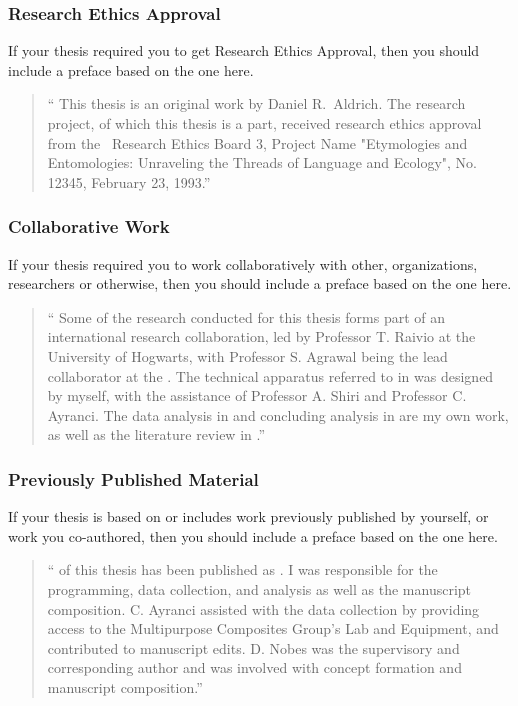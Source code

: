 			\subsubsection{Research Ethics Approval}\label{preface:REA}
				If your thesis required you to get Research Ethics Approval, then you should include a preface based on the one here.

				\begin{quote}
					\enquote{%
						This thesis is an original work by Daniel R.\ Aldrich. 
						The research project, of which this thesis is a part, received research ethics approval from the \UofA\ Research Ethics Board 3, Project Name "Etymologies and Entomologies: Unraveling the Threads of Language and Ecology", No. 12345, February 23, 1993.}%
				\end{quote}

			\subsubsection{Collaborative Work}\label{preface:CW}
				If your thesis required you to work collaboratively with other, organizations, researchers or otherwise, then you should include a preface based on the one here.

				\begin{quote}
					\enquote{%
						Some of the research conducted for this thesis forms part of an international research collaboration, led by Professor T. Raivio at the University of Hogwarts, with Professor S. Agrawal being the lead collaborator at the \UofA. 
						The technical apparatus referred to in  was designed by myself, with the assistance of Professor A. Shiri and Professor C. Ayranci. 
						The data analysis in  and concluding analysis in  are my own work, as well as the literature review in .}
				\end{quote}

			\subsubsection{Previously Published Material}\label{preface:PPW}
				If your thesis is based on or includes work previously published by yourself, or work you co-authored, then you should include a preface based on the one here.

				\begin{quote}
					\enquote{%
						 of this thesis has been published as . 
						I was responsible for the programming, data collection, and analysis as well as the manuscript composition. C. Ayranci assisted with the data collection by providing access to the Multipurpose Composites Group's Lab and Equipment, and contributed to manuscript edits. D. Nobes was the supervisory and corresponding author and was involved with concept formation and manuscript composition.}
				\end{quote}

